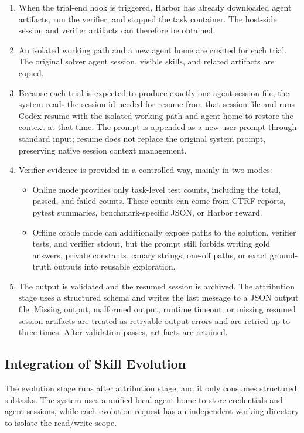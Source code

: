 \documentclass{llmxive}
\begin{document}
\begin{enumerate}
    \item When the trial-end hook is triggered, Harbor has already downloaded agent artifacts, run the verifier, and stopped the task container. The host-side session and verifier artifacts can therefore be obtained.
    \item An isolated working path and a new agent home are created for each trial. The original solver agent session, visible skills, and related artifacts are copied.
    \item Because each trial is expected to produce exactly one agent session file, the system reads the session id needed for resume from that session file and runs Codex resume with the isolated working path and agent home to restore the context at that time. The prompt is appended as a new user prompt through standard input; resume does not replace the original system prompt, preserving native session context management.
    \item Verifier evidence is provided in a controlled way, mainly in two modes:
    \begin{itemize}
        \item Online mode provides only task-level test counts, including the total, passed, and failed counts. These counts can come from CTRF reports, pytest summaries, benchmark-specific JSON, or Harbor reward.
        \item Offline oracle mode can additionally expose paths to the solution, verifier tests, and verifier stdout, but the prompt still forbids writing gold answers, private constants, canary strings, one-off paths, or exact ground-truth outputs into reusable exploration.
    \end{itemize}
    \item The output is validated and the resumed session is archived. The attribution stage uses a structured schema and writes the last message to a JSON output file. Missing output, malformed output, runtime timeout, or missing resumed session artifacts are treated as retryable output errors and are retried up to three times. After validation passes, artifacts are retained.
\end{enumerate}

\subsection{Integration of Skill Evolution}
The evolution stage runs after attribution stage, and it only consumes structured subtasks. The system uses a unified local agent home to store credentials and agent sessions, while each evolution request has an independent working directory to isolate the read/write scope.
\end{document}

